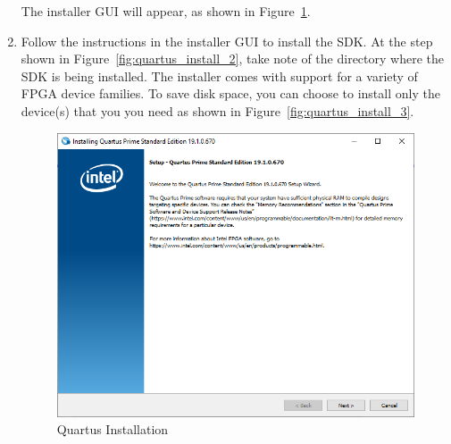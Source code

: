 \documentclass[11pt, twoside, pdftex]{article}
\begin{document}
\begin{enumerate}
The installer GUI will appear, as shown in Figure~\ref{fig:quartus_install_1}.
\item Follow the instructions in the installer GUI to install the SDK. At the step shown in Figure~\ref{fig:quartus_install_2}, take note of the directory where the SDK is being installed. The installer comes with support for a variety of FPGA device families. To save disk space, you can choose to install only the device(s) that you you need as shown in Figure~\ref{fig:quartus_install_3}. 
	\begin{figure} [H]
	\begin{center}
	\includegraphics[scale = 0.7]{figures/fig_install_1.png}
	\end{center}
	\caption{Quartus Installation}
	\label{fig:quartus_install_1}
	\end{figure}
	

\end{enumerate}
\end{document}

